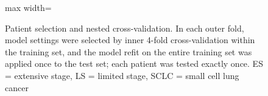 \documentclass{article}
\begin{document}
\begin{figure}[htbp]
\begin{adjustbox}{max width=\textwidth}
\end{adjustbox}
\caption{Patient selection and nested cross-validation. In each outer fold, model settings were selected by inner 4-fold cross-validation within the training set, and the model refit on the entire training set was applied once to the test set; each patient was tested exactly once. ES = extensive stage, LS = limited stage, SCLC = small cell lung cancer}
\label{fig:flowchart}
\end{figure}


\end{document}
